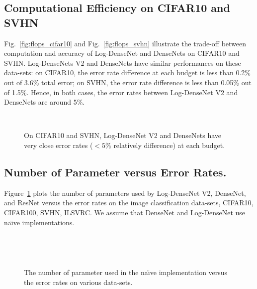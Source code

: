 \documentclass{article}
\newcommand{\logdense}{Log-DenseNet\xspace}
\newcommand{\logdenses}{Log-DenseNets\xspace}
\newcommand{\naive}{na\"{\i}ve\xspace}
\begin{document}
\subsection{Computational Efficiency on CIFAR10 and SVHN}

Fig.~\ref{fig:flops_cifar10} and Fig.~\ref{fig:flops_svhn} illustrate the trade-off between computation and accuracy of \logdense and DenseNets on CIFAR10 and SVHN. \logdenses V2 and DenseNets have similar performances on these data-sets: on CIFAR10, the error rate difference at each budget is less than 0.2\% out of 3.6\% total error; on SVHN, the error rate difference is less than 0.05\% out of 1.5\%. Hence, in both cases, the error rates between \logdense V2 and DenseNets are around 5\%. 

\begin{figure}[t]
    \centering
    ~
    \caption{On CIFAR10 and SVHN, \logdense V2 and DenseNets have very close error rates ($<5\%$ relatively difference) at each budget.}
\end{figure}


\subsection{Number of Parameter  versus Error Rates. }
Figure~\ref{fig:params_all_data} plots the number of parameters used by \logdense V2, DenseNet, and ResNet versus the error rates on the image classification data-sets, CIFAR10, CIFAR100, SVHN, ILSVRC. We assume that DenseNet and \logdense use \naive implementations. 

\begin{figure}
    \centering
    ~
    
    ~
    \caption{The number of parameter used in the \naive implementation versus the error rates on various data-sets.}
    \label{fig:params_all_data}
\end{figure}
\end{document}
